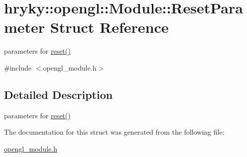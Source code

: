 \hypertarget{structhryky_1_1opengl_1_1_module_1_1_reset_parameter}{\section{hryky\-:\-:opengl\-:\-:Module\-:\-:Reset\-Parameter Struct Reference}
\label{structhryky_1_1opengl_1_1_module_1_1_reset_parameter}
}


parameters for \hyperlink{classhryky_1_1opengl_1_1_module_af09eb5e4e4a6e8f89efdc7b97a220556}{reset()}  




{\ttfamily \#include $<$opengl\-\_\-module.\-h$>$}



\subsection{Detailed Description}
parameters for \hyperlink{classhryky_1_1opengl_1_1_module_af09eb5e4e4a6e8f89efdc7b97a220556}{reset()} 

The documentation for this struct was generated from the following file\-:\begin{DoxyCompactItemize}
\item 
\hyperlink{opengl__module_8h}{opengl\-\_\-module.\-h}\end{DoxyCompactItemize}
